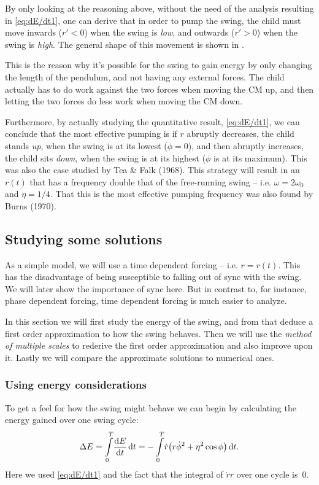 \documentclass[10pt,letter, swedish, english,%
]{article}
\begin{document}
By only looking at the reasoning above, without the need of the
analysis resulting in \eqref{eq:dE/dt1}, one can derive that in
order to pump the swing, the child must move inwards ($r'<0$) when the
swing is \emph{low}, and outwards ($r'>0$) when the swing is 
\emph{high}. The general shape of this movement is shown in
. 

This is the reason why it's possible for the swing to gain energy by
only changing the length of the pendulum, and not having any external
forces. The child actually has to do work against the two forces when
moving the CM up, and then letting  the two forces do less work
when moving the CM down.

Furthermore, by actually studying the quantitative result,
\eqref{eq:dE/dt1}, we can conclude that the most effective pumping
is if $r$ abruptly decreases, the child stands \emph{up}, when
the swing is at its lowest ($\phi=0$), and then abruptly increases,
the child sits \emph{down}, when the swing is at its highest ($\phi$
is at its maximum). This was also the case studied by Tea \&
Falk (1968). %
This strategy will result in an $r(t)$ that has a frequency 
double that of the free-running swing -- i.e. $\omega=2\omega_0$ and
$\eta=1/4$. That this is the most effective pumping frequency was also
found by Burns (1970). %




\subsection{Studying some solutions}
As a simple model, we will use a time dependent forcing --
i.e. $r=r(t)$. This has the disadvantage of being susceptible to
falling out of sync with the swing. We will later show the importance
of sync here. But in contrast to, for instance, phase dependent forcing,
time dependent forcing is much easier to analyze. 

In this section we will first study the energy of the swing, and from
that deduce a first order approximation to how the swing behaves. Then
we will use the \emph{method of multiple scales} to rederive the first
order approximation and also improve upon it. Lastly we will compare
the approximate solutions to numerical ones. 



\subsubsection{Using energy considerations}
\newcommand{\DE}{\Delta{E}}
To get a feel for how the swing might behave we can begin by
calculating the energy gained over one swing cycle:
\begin{equation}\label{eq:DE1}
\DE=\int_0^T\!\dv{E}{t}\id{t}
=-\int_0^T\! \dot{r}\qty(r\dot{\phi}^2 + \eta^2\cos\phi)\id{t}.
\end{equation}
Here we used \eqref{eq:dE/dt1} and the fact that the integral of
$\dot{r}\ddot{r}$ over one cycle is~$0$. 
\end{document}
